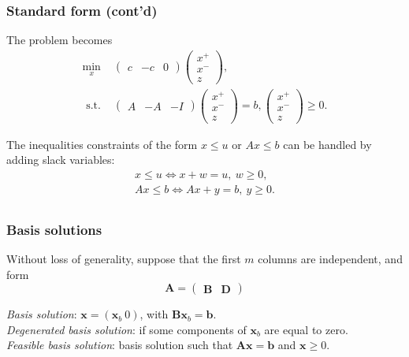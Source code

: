 \documentclass{beamer}
\def\bb{\boldsymbol{b}}
\def\bx{\boldsymbol{x}}
\def\bA{\boldsymbol{A}}
\def\bB{\boldsymbol{B}}
\def\bD{\boldsymbol{D}}
\begin{document}
\begin{frame}
\frametitle{Standard form (cont'd)}

The problem becomes
\begin{align*}
\min_x\ &
\begin{pmatrix}
c & -c & 0
\end{pmatrix}
\begin{pmatrix}
x^+ \\ x^- \\ z
\end{pmatrix}, \\
\mbox{ s.t. } &
\begin{pmatrix}
A & -A & -I
\end{pmatrix}
\begin{pmatrix}
x^+ \\ x^- \\ z
\end{pmatrix} = b,
\begin{pmatrix}
x^+ \\ x^- \\ z
\end{pmatrix} \geq 0.
\end{align*}

The inequalities constraints of the form $x \leq u$ or $Ax \leq b$ can be handled by adding slack variables:
\begin{align*}
x \leq u \Leftrightarrow x+w = u,\ w \geq 0, \\
Ax \leq b \Leftrightarrow Ax + y = b,\ y \geq 0. \\
\end{align*}

\end{frame}

\begin{frame}
	\frametitle{Basis solutions}

Without loss of generality, suppose that the first $m$ columns are independent, and form
	\[
	\bA =
	\begin{pmatrix}
		\bB & \bD
	\end{pmatrix}
	\]
	
	\mbox{}
	
	{\it Basis solution}: $\bx = (\bx_b \ 0)$, with $\bB\bx_b = \bb$.\\
	{\it Degenerated basis solution}: if some components of $\bx_b$ are equal to zero. \\
	{\it Feasible basis solution}: basis solution such that $\bA\bx = \bb$ and $\bx \geq 0$.

\end{frame}
\end{document}
